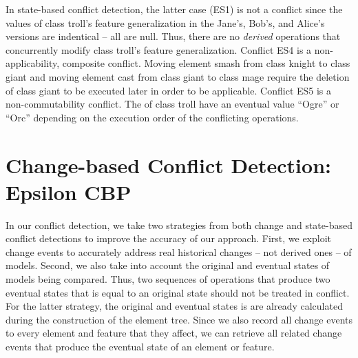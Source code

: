 In state-based conflict detection, the latter case (ES1) is not a conflict since the values of class \textsf{troll}'s feature \textsf{generalization} in the Jane's, Bob's, and Alice's versions are indentical -- all are null. Thus, there are no \textit{derived} operations that concurrently modify class \textsf{troll}'s feature \textsf{generalization}. Conflict ES4 is a non-applicability, composite conflict. Moving element \textsf{smash} from class \textsf{knight} to class \textsf{giant} and moving element \textsf{cast} from class \textsf{giant} to class \textsf{mage} require the deletion of class \textsf{giant} to be executed later in order to be applicable. Conflict ES5 is a non-commutability conflict. The  of class \textsf{troll} have an eventual value ``Ogre'' or ``Orc'' depending on the execution order of the conflicting operations.

\section{Change-based Conflict Detection: Epsilon CBP}
\label{change_based_conflict_detection_epsilon_cbp}

In our conflict detection, we take two strategies from both change and state-based conflict detections to improve the accuracy of our approach. First, we exploit change events to accurately address real historical changes -- not derived ones -- of models. Second, we also take into account the original and eventual states of models being compared. Thus, two sequences of operations that produce two eventual states that is equal to an original state should not be treated in conflict. For the latter strategy, the original and eventual states is are already calculated during the construction of the \textsf{element tree}. Since we also record all change events to every element and feature that they affect, we can retrieve all related change events that produce the eventual state of an element or feature. 

